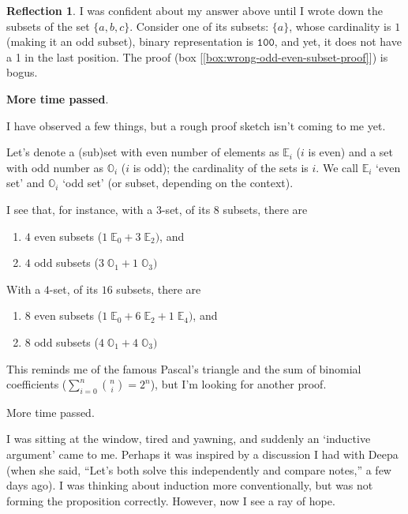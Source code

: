 \documentclass[11pt]{book}
\theoremstyle{definition}
\theoremstyle{plain}
\theoremstyle{definition}
\theoremstyle{problemstyle}
\theoremstyle{remark}
\theoremstyle{definition}
\newtheorem{reflection}{Reflection}
\begin{document}
\begin{reflection}
    I was confident about my answer above until I wrote down the subsets of the set $\{a,b,c\}$. Consider one of its subsets: $\{a\}$, whose cardinality is $1$ (making it an odd subset), binary representation is $\mathtt{100}$, and yet, it does not have a 1 in the last position. The proof (box [\ref{box:wrong-odd-even-subset-proof}]) is bogus.

    \textbf{More time passed}. 

    I have observed a few things, but a rough proof sketch isn't coming to me yet. 

    Let's denote a (sub)set with even number of elements as $\mathbb{E}_i$ ($i$ is even) and a set with odd number as $\mathbb{O}_i$ ($i$ is odd); the cardinality of the sets is $i$. We call $\mathbb{E}_i$ `even set' and $\mathbb{O}_i$ `odd set' (or subset, depending on the context).

    I see that, for instance, with a $3$-set, of its $8$ subsets, there are
    \begin{enumerate}
        \item $4$ even subsets ($1\;\mathbb{E}_0+3\;\mathbb{E}_2)$, and
        \item $4$ odd subsets ($3\;\mathbb{O}_1+1\;\mathbb{O}_3)$
    \end{enumerate}

    With a $4$-set, of its $16$ subsets, there are
    \begin{enumerate}
        \item $8$ even subsets ($1\;\mathbb{E}_0+6\;\mathbb{E}_2+1\;\mathbb{E}_4)$, and
        \item $8$ odd subsets ($4\;\mathbb{O}_1+4\;\mathbb{O}_3)$
    \end{enumerate}

    This reminds me of the famous Pascal's triangle and the sum of binomial coefficients ($\sum_{i=0}^{n}\binom{n}{i}=2^n$), but I'm looking for another proof.

    More time passed.

    I was sitting at the window, tired and yawning, and suddenly an `inductive argument' came to me. Perhaps it was inspired by a discussion I had with Deepa (when she said, ``Let's both solve this independently and compare notes,'' a few days ago). I was thinking about induction more conventionally, but was not forming the proposition correctly. However, now I see a ray of hope.

\end{reflection}
\end{document}
